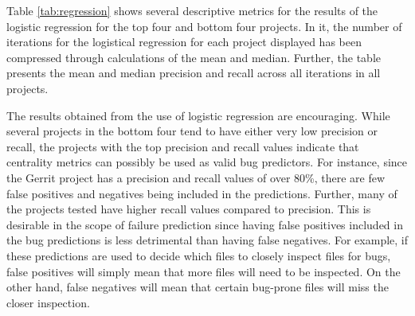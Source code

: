 \documentclass{sig-alternate-05-2015}
\begin{document}
Table \ref{tab:regression} shows several descriptive metrics for the results of the logistic regression for the top four and bottom four projects. In it, the number of iterations for the logistical regression for each project displayed has been compressed through calculations of the mean and median. Further, the table presents the mean and median precision and recall across all iterations in all projects. 

The results obtained from the use of logistic regression are encouraging. While several projects in the bottom four tend to have either very low precision or recall, the projects with the top precision and recall values indicate that centrality metrics can possibly be used as valid bug predictors. For instance, since the Gerrit project has a precision and recall values of over 80\%, there are few false positives and negatives being included in the predictions. Further, many of the projects tested have higher recall values compared to precision. This is desirable in the scope of failure prediction since having false positives included in the bug predictions is less detrimental than having false negatives. For example, if these predictions are used to decide which files to closely inspect files for bugs, false positives will simply mean that more files will need to be inspected. On the other hand, false negatives will mean that certain bug-prone files will miss the closer inspection.
\end{document}
